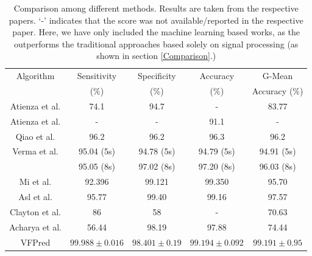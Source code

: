 \documentclass[12pt,a4paper]{article}
\begin{document}
	\begin{table}[h]
		\caption{Comparison among different methods. Results are taken from the respective papers. `-' indicates that the score was not available/reported in the respective paper. Here, we have only included the machine learning based works, as the outperforms the traditional approaches based solely on signal processing (as shown in section \ref{Comparison}.)}
		\label{tab:comp}
		\small
        \begin{tabular}{ | c | c | c | c | c |}
			\hline
			Algorithm & Sensitivity & Specificity & Accuracy & G-Mean \\  & (\%) & (\%) & (\%) & Accuracy (\%)\\
			\hline
			Atienza et al. \cite{alonso2012feature} & 74.1 & 94.7 & - & 83.77 \\
			\hline
			Atienza et al. \cite{alonso2014detection} & - & - & 91.1 & - \\
			\hline
			Qiao et al. \cite{li2014ventricular} & 96.2 & 96.2 & 96.3 & 96.2 \\
			\hline
			Verma et al. \cite{verma2016detection} & 95.04 (5s) & 94.78 (5s) & 94.79 (5s) & 94.91 (5s)  \\
             & 95.05 (8s) & 97.02 (8s) & 97.20 (8s) & 96.03 (8s) \\
			\hline
			Mi et al. \cite{song2005support} & 92.396 & 99.121 & 99.350 & 95.70 \\
			\hline
			Asl et al. \cite{asl2008support} & 95.77 & 99.40 & 99.16 & 97.57 \\
			\hline
			Clayton et al. \cite{clayton1994recognition} & 86 & 58 & - & 70.63 \\
			\hline
			Acharya et al. \cite{acharya2017automated} & 56.44 & 98.19 & 97.88 & 74.44 \\
			\hline \hline
			VFPred & $99.988 \pm 0.016$ & $98.401 \pm 0.19$ & $99.194 \pm 0.092$ & $99.191 \pm 0.95$ \\
			\hline
			
		\end{tabular}

	\end{table}
\end{document}
